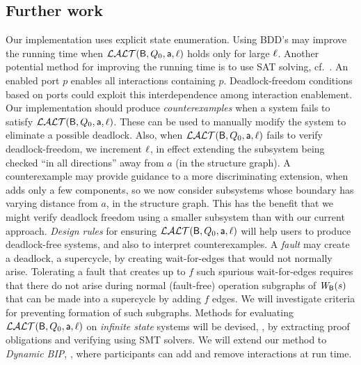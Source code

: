 \subsection{Further work} 
Our implementation uses explicit state enumeration. %
Using BDD's may improve the running time 
when $\mathcal{LALT}(\mathsf{B}, Q_0, \mathsf{a}, \ell)$ holds only for large $\ell$.
Another potential method for improving the running time is to use 
SAT solving, cf.\ .
%
%
An enabled port $p$ enables all interactions containing $p$.
Deadlock-freedom conditions based on ports could exploit
this interdependence among interaction enablement.
%
Our implementation should produce \emph{counterexamples} when a system fails to satisfy $\mathcal{LALT}(\mathsf{B}, Q_0, \mathsf{a}, \ell)$. These can be used to manually modify the system
to eliminate a possible deadlock.  Also, when $\mathcal{LALT}(\mathsf{B}, Q_0, \mathsf{a}, \ell)$ fails to verify deadlock-freedom, we increment $\ell$, in effect extending the
subsystem being checked ``in all directions'' away from $a$ (in the structure graph). A counterexample may provide guidance to a more discriminating
extension, when adds only a few components, so we now consider subsystems whose boundary has varying distance from $a$, in the structure graph. This
has the benefit that we might verify deadlock freedom using a smaller subsystem than with our current approach.
%
\emph{Design rules} for ensuring $\mathcal{LALT}(\mathsf{B}, Q_0, \mathsf{a}, \ell)$ will help users to
produce deadlock-free systems, and also to interpret counterexamples.
%
A \emph{fault} may create a deadlock,  \ie a supercycle, by creating 
wait-for-edges that would not normally arise.
Tolerating a fault that creates up to $f$ such spurious wait-for-edges 
requires that there do not arise during normal
(fault-free) operation subgraphs of $\mathit{W}_{\mathsf{B}}({s})$ that can be made into a
supercycle by adding $f$ edges. 
We will investigate criteria for preventing formation of such subgraphs.
%
Methods for evaluating $\mathcal{LALT}(\mathsf{B}, Q_0, \mathsf{a}, \ell)$ on \emph{infinite state} systems will be
devised, \eg, by extracting proof obligations and verifying using SMT solvers.
%
We will extend our method to \emph{Dynamic BIP},
\cite{DBLP:conf/soco/BozgaJMS12}, where participants can add and remove
interactions at run time.


